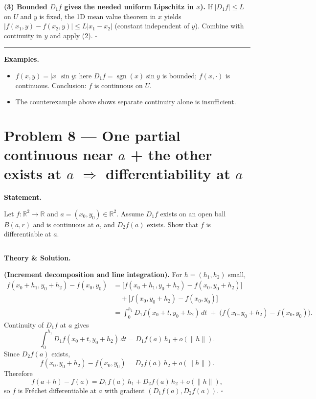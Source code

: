\documentclass[12pt,a4paper]{article}
\theoremstyle{plain}
\theoremstyle{definition}
\theoremstyle{remark}
\theoremstyle{remark}
\newcommand{\gap}{\vspace{6pt}}
\begin{document}
\textbf{(3) Bounded $D_1 f$ gives the needed uniform Lipschitz in $x$).}\;
If $|D_1 f|\le L$ on $U$ and $y$ is fixed, the 1D mean value theorem in $x$ yields
$|f(x_1,y)-f(x_2,y)|\le L|x_1-x_2|$ (constant independent of $y$).
Combine with continuity in $y$ and apply (2). \hfill$\square$

\bigskip\hrule\bigskip

\textbf{Examples.}\gap

\begin{itemize}\setlength{\itemsep}{6pt}
	\item $f(x,y)=|x|\,\sin y$: here $D_1 f=\operatorname{sgn}(x)\sin y$ is bounded; $f(x,\cdot)$ is continuous. Conclusion: $f$ is continuous on $U$.
	\item The counterexample above shows separate continuity alone is insufficient.
\end{itemize}


\section*{Problem 8 — One partial continuous near $a$ + the other exists at $a$ $\Rightarrow$ differentiability at $a$}

\textbf{Statement.}\gap

Let $f:\mathbb{R}^2\to\mathbb{R}$ and $a=(x_0,y_0)\in\mathbb{R}^2$.
Assume $D_1 f$ exists on an open ball $B(a,r)$ and is continuous at $a$, and $D_2 f(a)$ exists.
Show that $f$ is differentiable at $a$.

\bigskip\hrule\bigskip

\textbf{Theory \& Solution.}\gap

\textbf{(Increment decomposition and line integration).}\;
For $h=(h_1,h_2)$ small,
\[
\begin{aligned}
	f(x_0+h_1,y_0+h_2)-f(x_0,y_0)
	&=\big[f(x_0+h_1,y_0+h_2)-f(x_0,y_0+h_2)\big] \\
	&\quad + \big[f(x_0,y_0+h_2)-f(x_0,y_0)\big] \\
	&= \int_{0}^{h_1} D_1 f(x_0+t,y_0+h_2)\,dt \;+\; \big(f(x_0,y_0+h_2)-f(x_0,y_0)\big).
\end{aligned}
\]
Continuity of $D_1 f$ at $a$ gives
\[
\int_{0}^{h_1} D_1 f(x_0+t,y_0+h_2)\,dt
= D_1 f(a)\,h_1 + o(\|h\|).
\]
Since $D_2 f(a)$ exists,
\[
f(x_0,y_0+h_2)-f(x_0,y_0)= D_2 f(a)\,h_2 + o(\|h\|).
\]
Therefore
\[
f(a+h)-f(a) = D_1 f(a)\,h_1 + D_2 f(a)\,h_2 + o(\|h\|),
\]
so $f$ is Fr\'echet differentiable at $a$ with gradient $(D_1 f(a),D_2 f(a))$. \hfill$\square$
\end{document}
